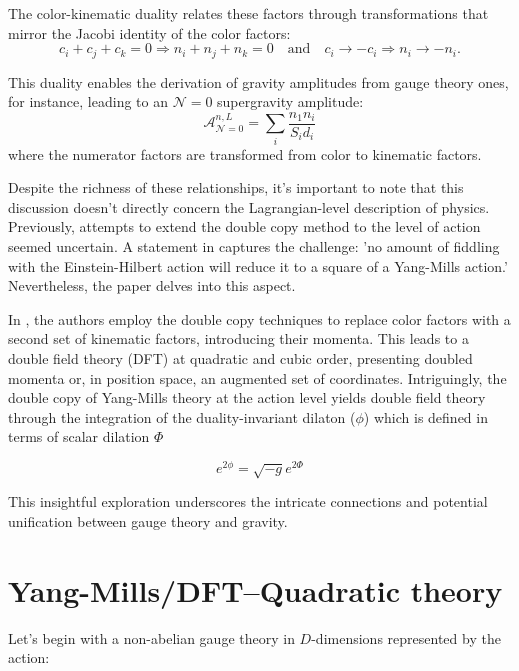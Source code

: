 \documentclass[13pt]{article}
\begin{document}
The color-kinematic duality relates these factors through transformations that mirror the Jacobi identity of the color factors:
\begin{equation}
c_i + c_j + c_k = 0 \Rightarrow n_i + n_j + n_k = 0 \quad \text{and} \quad c_i \rightarrow -c_i \Rightarrow n_i \rightarrow -n_i. \tag{3}
\end{equation}

This duality enables the derivation of gravity amplitudes from gauge theory ones, for instance, leading to an $\mathcal{N} = 0$ supergravity amplitude:
\begin{equation}
\mathcal{A}_{\mathcal{N}=0}^{n,L} = \sum_i \frac{n_1 n_i}{S_i d_i} \tag{4}
\end{equation}
where the numerator factors are transformed from color to kinematic factors.

Despite the richness of these relationships, it's important to note that this discussion doesn't directly concern the Lagrangian-level description of physics. Previously, attempts to extend the double copy method to the level of action seemed uncertain. A statement in \cite{Grassmann} captures the challenge: 'no amount of fiddling with the Einstein-Hilbert action will reduce it to a square of a Yang-Mills action.' Nevertheless, the paper \cite{D_az_Jaramillo_2022} delves into this aspect.

In \cite{D_az_Jaramillo_2022}, the authors employ the double copy techniques to replace color factors with a second set of kinematic factors, introducing their momenta. This leads to a double field theory (DFT) at quadratic and cubic order, presenting doubled momenta or, in position space, an augmented set of coordinates. Intriguingly, the double copy of Yang-Mills theory at the action level yields double field theory through the integration of the duality-invariant dilaton ($\phi$) which is defined in terms of scalar dilation $\Phi$ \cite{D_az_Jaramillo_2022}

$$e^{2\phi}=\sqrt{-g}e^{2\Phi}$$

This insightful exploration underscores the intricate connections and potential unification between gauge theory and gravity.

\section{ Yang-Mills/DFT–Quadratic theory}

Let's begin with a non-abelian gauge theory in \(D\)-dimensions represented by the action:
\end{document}
